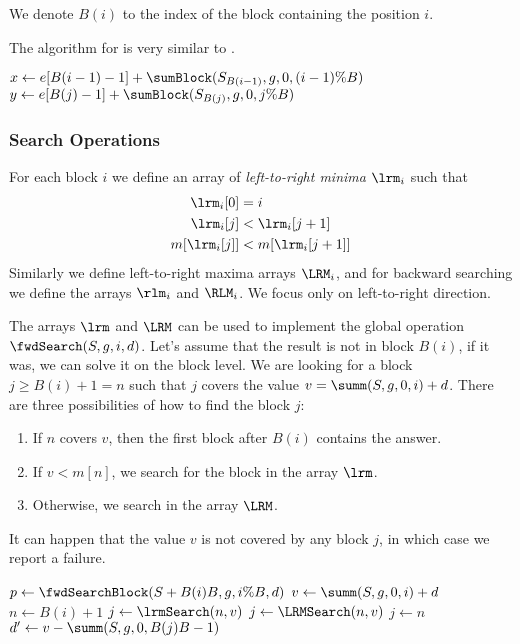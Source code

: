 \bigbreak

We denote $B(i)$ to the index of the block containing the position $i$.

The algorithm for \summ is very similar to \sumBlock.

\begin{algorithmic}
	\State $x \gets e[B(i - 1) - 1] + \sumBlock(S_{B(i - 1)}, g, 0, (i - 1) \% B)$
	\State $y \gets e[B(j) - 1] + \sumBlock(S_{B(j)}, g, 0, j \% B)$
	\State {}
\EndFunction
\end{algorithmic}

\subsubsection{Search Operations}

For each block $i$ we define an array of \emph{left-to-right minima} $\lrm_i$ such that
\begin{align*}
	\lrm_i[0] &= i \\
	\lrm_i[j] &< \lrm_i[j+1] \\
	m[\lrm_i[j]] &< m[\lrm_i[j+1]]
\end{align*}
Similarly we define left-to-right maxima arrays $\LRM_i$, and for backward searching we define the arrays $\rlm_i$ and $\RLM_i$.
We focus only on left-to-right direction.

The arrays $\lrm$ and $\LRM$ can be used to implement the global operation $\fwdSearch(S, g, i, d)$.
Let's assume that the result is not in block $B(i)$, if it was, we can solve it on the block level.
We are looking for a block $j \ge B(i) + 1 = n$ such that $j$ covers the value $v = \summ(S, g, 0, i) + d$.
There are three possibilities of how to find the block $j$:
\begin{enumerate}
	\item If $n$ covers $v$, then the first block after $B(i)$ contains the answer.
	\item If $v < m[n]$, we search for the block in the array $\lrm$.
	\item Otherwise, we search in the array $\LRM$.
\end{enumerate}
It can happen that the value $v$ is not covered by any block $j$, in which case we report a failure.

\begin{algorithmic}
	\State $p \gets \fwdSearchBlock(S + B(i) B, g, i \% B, d)$ 
		\State {}
	\Else
		\State $v \gets \summ(S, g, 0, i) + d$
		\State $n \gets B(i) + 1$
			\State $j \gets \lrmSearch(n, v)$
			\State $j \gets \LRMSearch(n, v)$
		\Else
			\State $j \gets n$
		\EndIf
		 
			\State {}
		\Else
			\State $d' \gets v - \summ(S, g, 0, B(j) B - 1)$
			\State {}
		\EndIf
	\EndIf
\EndFunction
\end{algorithmic}

